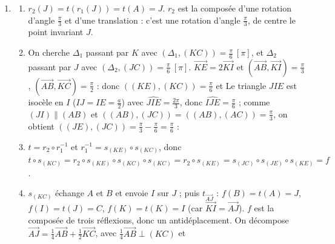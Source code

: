 \begin{corrige}
\begin{sol}
\begin{description}
\begin{enumerate}
\begin{enumerate}
                              qui sont distinctes ; c'est le centre de $r_1$.
                              Le triangle $KBI$ est équilatéral et direct (même orientation que $ABC$), donc $(\overrightarrow{KB},\overrightarrow{KI}) = \frac{\pi}{3}$.
                  \end{enumerate}
            \item \begin{enumerate}
                        \item $r_2(J) = t(r_1(J)) = t(A) = J$. $r_2$ est la composée d'une rotation d'angle $\frac{\pi}{3}$ et d'une translation :
                              c'est une rotation d'angle $\frac{\pi}{3}$, de centre le point invariant $J$. 
                        \item On cherche $\Delta_1$ passant par $K$ avec $(\Delta_1,(KC)) = \frac{\pi}{6}\ [\pi]$, et $\Delta_2$ passant par $J$ avec $(\Delta_2,(JC)) = \frac{\pi}{6}\ [\pi]$.
                              $\overrightarrow{KE} = 2\overrightarrow{KI}$ et $(\overrightarrow{AB},\overrightarrow{KI}) = \frac{\pi}{3}$, $(\overrightarrow{AB},\overrightarrow{KC}) = \frac{\pi}{2}$ :
                              donc $((KE),(KC)) = \frac{\pi}{6}$ et 
                              Le triangle $JIE$ est isocèle en $I$ ($IJ = IE = \frac{a}{2}$) avec $\widehat{JIE} = \frac{2\pi}{3}$, donc $\widehat{IJE} = \frac{\pi}{6}$ ;
                              comme $(JI) \parallel (AB)$ et $((AB),(JC)) = ((AB),(AC)) = \frac{\pi}{3}$, on obtient $((JE),(JC)) = \frac{\pi}{3} - \frac{\pi}{6} = \frac{\pi}{6}$ :
                        \item $t = r_2 \circ r_1^{-1}$ et $r_1^{-1} = s_{(KE)} \circ s_{(KC)}$, donc
                              $t \circ s_{(KC)} = r_2 \circ s_{(KE)} \circ s_{(KC)} \circ s_{(KC)} = r_2 \circ s_{(KE)} = s_{(JC)} \circ s_{(JE)} \circ s_{(KE)} = f$.
                        \item $s_{(KC)}$ échange $A$ et $B$ et envoie $I$ sur $J$ ; puis $t_{\overrightarrow{AJ}}$ : $f(B) = t(A) = J$, $f(I) = t(J) = C$,
                              $f(K) = t(K) = I$ (car $\overrightarrow{KI} = \overrightarrow{AJ}$). 
                              $f$ est la composée de trois réflexions, donc un antidéplacement.
                              On décompose $\overrightarrow{AJ} = \frac14\overrightarrow{AB} + \frac12\overrightarrow{KC}$, avec $\frac14\overrightarrow{AB} \perp (KC)$ et

\end{enumerate}
\end{enumerate}
\end{description}
\end{sol}
\end{corrige}
